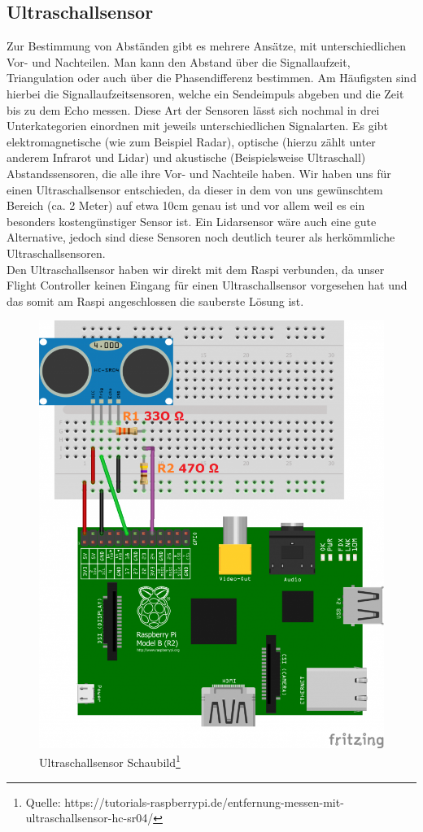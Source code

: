\subsection{Ultraschallsensor}
Zur Bestimmung von Abständen gibt es mehrere Ansätze, mit unterschiedlichen Vor- und Nachteilen. Man kann den Abstand über die Signallaufzeit, Triangulation oder auch über die Phasendifferenz bestimmen. Am Häufigsten sind hierbei die Signallaufzeitsensoren, welche ein Sendeimpuls abgeben und die Zeit bis zu dem Echo messen. Diese Art der Sensoren lässt sich nochmal in drei Unterkategorien einordnen mit jeweils unterschiedlichen Signalarten. Es gibt elektromagnetische (wie zum Beispiel Radar), optische (hierzu zählt unter anderem Infrarot und Lidar) und akustische (Beispielsweise Ultraschall) Abstandssensoren, die alle ihre Vor- und Nachteile haben. Wir haben uns für einen Ultraschallsensor entschieden, da dieser in dem von uns gewünschtem Bereich (ca. 2 Meter) auf etwa 10cm genau ist und vor allem weil es ein besonders kostengünstiger Sensor ist. Ein Lidarsensor wäre auch eine gute Alternative, jedoch sind diese Sensoren noch deutlich teurer als herkömmliche Ultraschallsensoren.
\\
Den Ultraschallsensor haben wir direkt mit dem Raspi verbunden, da unser Flight Controller keinen Eingang für einen Ultraschallsensor vorgesehen hat und das somit am Raspi angeschlossen die sauberste Lösung ist.
\begin{figure}[h]
	\centering
	\includegraphics[scale=0.3]{"Grafiken/Ultraschallsensor.png"}
	\caption{Ultraschallsensor Schaubild\footnote{Quelle: https://tutorials-raspberrypi.de/entfernung-messen-mit-ultraschallsensor-hc-sr04/}}
	\label{fig:ultraschall}
\end{figure}
